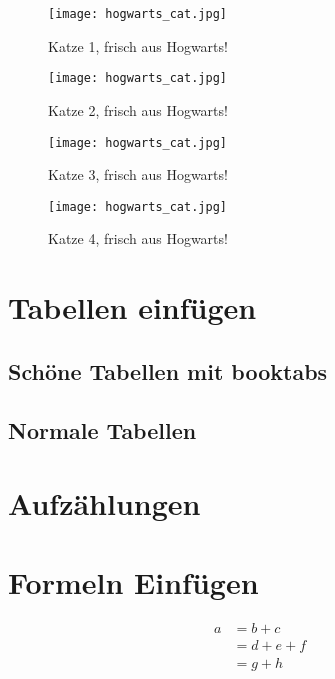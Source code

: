 \begin{figure}[H]
    \begin{minipage}{0.5\textwidth}
        \centering
        \texttt{[image: hogwarts\_cat.jpg]}
        \caption*{Katze 1, frisch aus Hogwarts!}
        \vspace{2ex}
    \end{minipage}
    \begin{minipage}{0.5\textwidth}
        \centering
        \texttt{[image: hogwarts\_cat.jpg]}
        \caption*{Katze 2, frisch aus Hogwarts!}
        \vspace{2ex}
    \end{minipage}
    \begin{minipage}{0.5\textwidth}
        \centering
        \texttt{[image: hogwarts\_cat.jpg]}
        \caption*{Katze 3, frisch aus Hogwarts!}
        \vspace{2ex}
    \end{minipage}
    \begin{minipage}{0.5\textwidth}
        \centering
        \texttt{[image: hogwarts\_cat.jpg]}
        \caption*{Katze 4, frisch aus Hogwarts!}
        \vspace{2ex}
    \end{minipage}
\end{figure}

\chapter{Tabellen einfügen}
\section{Schöne Tabellen mit booktabs}
\section{Normale Tabellen}

\chapter{Aufzählungen}

\chapter{Formeln Einfügen}
\begin{align}
    a & = b + c     \\
      & = d + e + f \\
      & = g + h
\end{align}


